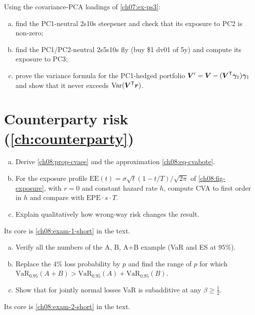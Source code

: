 \begin{paracol}{2}
\begin{exercise}\label{ch07:ex-fly}
Using the covariance-PCA loadings of \cref{ch07:ex-ps3}:
\begin{enumerate}[(a)]
  \item find the PC1-neutral 2s10s steepener and check
      that its exposure to PC2 is non-zero;
  \item find the PC1/PC2-neutral 2s5s10s fly (buy \$1 dv01 of 5y) and compute its
      exposure to PC3;
  \item prove the variance formula for the PC1-hedged portfolio $\bm V'=\bm V-(\bm V^{\mathsf T}\bm\gamma_1)\bm\gamma_1$ and show
      that it never exceeds $\operatorname{Var}(\bm V^{\mathsf T}\bm r)$.
\end{enumerate}
\end{exercise}

\section{Counterparty risk (\cref{ch:counterparty})}\label{exam:ch08}

\begin{exercise}\label{ch08:exam-1}
\leavevmode
\begin{enumerate}[(a)]
  \item Derive \cref{ch08:prop-cvaee} and the approximation \eqref{ch08:eq-cvabote}.
  \item For the exposure profile
      $\mathrm{EE}(t)=\sigma\sqrt t(1-t/T)/\sqrt{2\pi}$ of \cref{ch08:fig-exposure}, with $r=0$ and constant hazard rate $h$,
      compute CVA to first order in $h$ and compare with $\mathrm{EPE}\cdot s\cdot T$.
  \item Explain qualitatively how wrong-way
      risk changes the result.
\end{enumerate}
Its core is \cref{ch08:exam-1-short} in the text.
\end{exercise}

\begin{exercise}\label{ch08:exam-2}
\leavevmode
\begin{enumerate}[(a)]
  \item Verify all the numbers of the A, B, A+B example (VaR and ES at $95\%$).
  \item Replace the $4\%$ loss probability by
      $p$ and find the range of $p$ for which $\mathrm{VaR}_{0.95}(A+B)>\mathrm{VaR}_{0.95}(A)+\mathrm{VaR}_{0.95}(B)$.
  \item Show that for jointly normal losses VaR is subadditive at any $\beta\ge\frac12$.
\end{enumerate}
Its core is \cref{ch08:exam-2-short} in the text.
\end{exercise}


\end{paracol}
